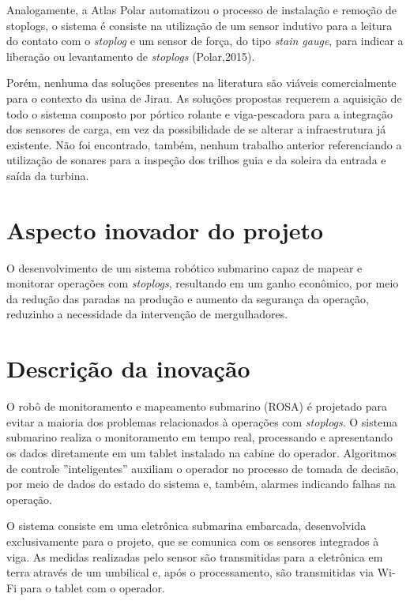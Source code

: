 \begin{itemize}
Analogamente, a Atlas Polar automatizou o processo de instalação e remoção de
stoplogs, o sistema é consiste na utilização de um sensor indutivo para a
leitura do contato com o \textit{stoplog} e um sensor de força, do tipo
\textit{stain gauge}, para indicar a liberação ou levantamento de
\textit{stoplogs} (Polar,2015).

Porém, nenhuma das soluções presentes na literatura são viáveis comercialmente
para o contexto da usina de Jirau. As soluções propostas requerem a aquisição de todo o
sistema composto por pórtico rolante e viga-pescadora para a integração dos
sensores de carga, em vez da possibilidade de se alterar a infraestrutura já
existente.
Não foi encontrado, também, nenhum trabalho anterior referenciando a utilização
de sonares para a inspeção dos trilhos guia e da soleira da entrada e saída da turbina.

\section*{Aspecto inovador do projeto}

O desenvolvimento de um sistema robótico submarino capaz de mapear e monitorar
operações com \textit{stoplogs}, resultando em um ganho econômico, por meio da
redução das paradas na produção e aumento da segurança da operação,
reduzinho a necessidade da intervenção de mergulhadores.

\section*{Descrição da inovação}

O robô de monitoramento e mapeamento submarino (ROSA) é projetado para evitar a
maioria dos problemas relacionados à operações com \textit{stoplogs}. O sistema
submarino realiza o monitoramento em tempo real, processando e apresentando os
dados diretamente em um tablet instalado na cabine do operador. Algoritmos de
controle ''inteligentes'' auxiliam o operador no processo de tomada de decisão,
por meio de dados do estado do sistema e, também, alarmes indicando falhas na
operação.

O sistema consiste em uma eletrônica submarina embarcada, desenvolvida
exclusivamente para o projeto, que se comunica com os sensores integrados à
viga. As medidas realizadas pelo sensor são transmitidas para a
eletrônica em terra através de um umbilical e, após o processamento, são
transmitidas via Wi-Fi para o tablet com o operador.


\end{itemize}
